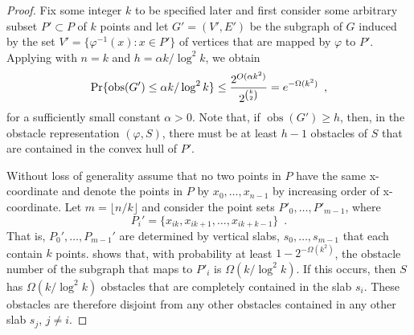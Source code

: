 \documentclass{patmorin}
\DeclareMathOperator{\obs}{obs}
\begin{document}
\begin{proof}
Fix some integer $k$ to be specified later and first consider some
arbitrary subset $P'\subset P$ of $k$ points and let $G'=(V',E')$
be the subgraph of $G$ induced by the set $V'=\{\varphi^{-1}(x):x\in
P'\}$ of vertices that are mapped by $\varphi$ to $P'$.  Applying
 with $n=k$ and $h=\alpha k/\log^2 k$, we obtain
\begin{equation}
     \Pr\{\obs(G') \le \alpha k/\log^2 k\} 
       \le \frac{2^{O(\alpha k^2)}}{2^{\binom{k}{2}}}
       = e^{-\Omega(k^2)} \enspace , \eqlabel{g1}
\end{equation}
for a sufficiently small constant $\alpha > 0$.  Note that, if
$\obs(G')\ge h$, then, in the obstacle representation $(\varphi,S)$,
there must be at least $h-1$ obstacles of $S$ that are contained in the
convex hull of $P'$.

Without loss of generality assume that no two points in $P$ have the
same x-coordinate and denote the points in $P$ by $x_0,\ldots,x_{n-1}$
by increasing order of x-coordinate.  Let $m=\lfloor n/k\rfloor$ and
consider the point sets $P'_0,\ldots,P'_{m-1}$, where
\[ 
  P_i'=\{x_{ik},x_{ik+1},\ldots,x_{ik+k-1}\} \enspace .
\]  
That is, $P_0',\ldots,P_{m-1}'$ are determined by vertical slabs,
$s_0,\ldots,s_{m-1}$ that each contain $k$ points.   shows
that, with probability at least $1-2^{-\Omega(k^2)}$, the obstacle number
of the subgraph that maps to $P'_i$ is $\Omega(k/\log^2 k)$.  If this
occurs, then $S$ has $\Omega(k/\log^2 k)$ obstacles that are completely
contained in the slab $s_i$.  These obstacles are therefore disjoint
from any other obstacles contained in any other slab $s_j$, $j\neq i$.


\end{proof}
\end{document}
